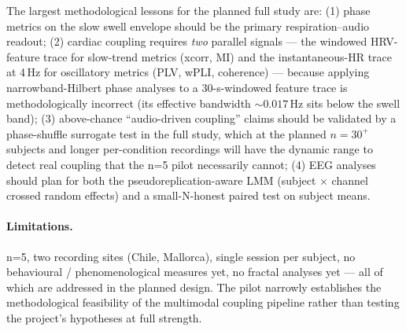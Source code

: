 \documentclass[11pt,a4paper]{article}
\begin{document}
The largest methodological lessons for the planned full study are: (1)
phase metrics on the slow swell envelope should be the primary
respiration--audio readout; (2) cardiac coupling requires \emph{two}
parallel signals --- the windowed HRV-feature trace for slow-trend
metrics (xcorr, MI) and the instantaneous-HR trace at 4\,Hz for
oscillatory metrics (PLV, wPLI, coherence) --- because applying
narrowband-Hilbert phase analyses to a 30-s-windowed feature trace is
methodologically incorrect (its effective bandwidth ${\sim}0.017$\,Hz
sits below the swell band); (3) above-chance ``audio-driven coupling''
claims should be validated by a phase-shuffle surrogate test in the
full study, which at the planned $n\!=\!30^+$ subjects and longer
per-condition recordings will have the dynamic range to detect real
coupling that the n=5 pilot necessarily cannot; (4) EEG analyses
should plan for both the pseudoreplication-aware LMM (subject
$\times$ channel crossed random effects) and a small-N-honest paired
test on subject means.

\paragraph{Limitations.} n=5, two recording sites (Chile, Mallorca), single session
per subject, no behavioural / phenomenological measures yet, no fractal
analyses yet --- all of which are addressed in the planned design. The pilot
narrowly establishes the methodological feasibility of the multimodal
coupling pipeline rather than testing the project's hypotheses at full
strength.


\renewcommand{\refname}{References}
\end{document}
